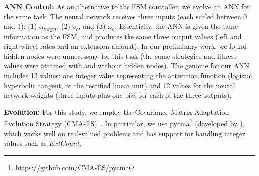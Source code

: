 

%
%


\vspace{0.1in}
\noindent
\textbf{ANN Control:}
As an alternative to the FSM controller, we evolve an ANN for the same task.
%
The neural network receives three inputs (each scaled between 0 and 1): (1) $\alpha_{\mathit{target}}$, (2) $v_e$, and (3) $\omega_e$.
%
Essentially, the ANN is given the same information as the FSM, and produces the same three output values (left and right wheel rates and an extension amount).
%
%
In our preliminary work, we found hidden nodes were unnecessary for this task (the same strategies and fitness values were attained with and without hidden nodes).
%
The genome for our ANN includes 13 values: one integer value representing the activation function (logistic, hyperbolic tangent, or the rectified linear unit) and 12 values for the neural network weights (three inputs plus one bias for each of the three outputs).



\vspace{0.1in}
\noindent
\textbf{Evolution:}
%
For this study, we employ the Covariance Matrix Adaptation Evolution Strategy (CMA-ES)~\citep{Hansen.2003.EC.CMAES}.
%
In particular, we use pycma\footnote{\url{https://github.com/CMA-ES/pycma}} (developed by \citeauthor{Hansen.2003.EC.CMAES}), which
%
works well on real-valued problems and has support for handling integer values such as $\mathit{ExtCount}$.
%
